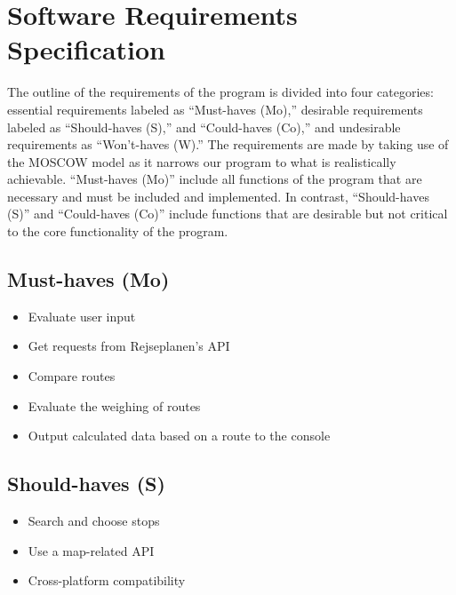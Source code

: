 \section{Software Requirements Specification}\label{sec:software-requirements-specification}

The outline of the requirements of the program is divided into four categories: essential requirements labeled as
``Must-haves (Mo),'' desirable requirements labeled as ``Should-haves (S),'' and ``Could-haves (Co),'' and
undesirable requirements as ``Won't-haves (W).''
The requirements are made by taking use of the MOSCOW model as it narrows our program to what is realistically
achievable.
``Must-haves (Mo)'' include all functions of the program that are necessary and must be included and implemented. In
contrast, ``Should-haves (S)'' and ``Could-haves (Co)'' include functions that are desirable but not critical to
the core functionality of the program.

\subsection{Must-haves (Mo)}\label{subsec:must-haves}

\begin{itemize}
    \item Evaluate user input
    \item Get requests from Rejseplanen’s API
    \item Compare routes
    \item Evaluate the weighing of routes
    \item Output calculated data based on a route to the console
\end{itemize}

\subsection{Should-haves (S)}\label{subsec:should-haves}

\begin{itemize}
    \item Search and choose stops
    \item Use a map-related API
    \item Cross-platform compatibility
\end{itemize}

